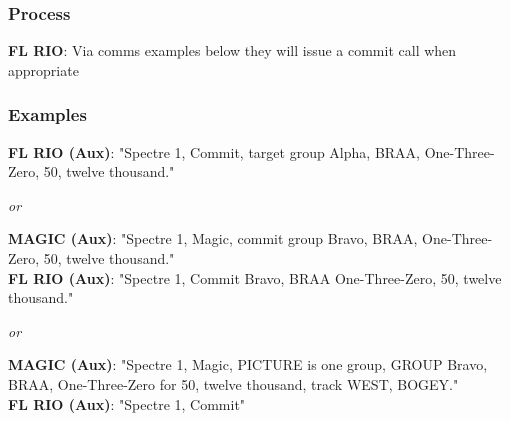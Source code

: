 \subsubsection*{Process}

\textbf{FL RIO}: Via comms examples below they will issue a commit call when
appropriate

\subsubsection*{Examples}

\textbf{FL RIO (Aux)}: "Spectre 1, Commit, target group Alpha, BRAA,
One-Three-Zero, 50, twelve thousand."

\textit{or}

\textbf{MAGIC (Aux)}: "Spectre 1, Magic, commit group Bravo, BRAA,
One-Three-Zero, 50, twelve thousand."\\
\textbf{FL RIO (Aux)}: "Spectre 1, Commit Bravo, BRAA One-Three-Zero, 50,
twelve thousand."

\textit{or}

\textbf{MAGIC (Aux)}: "Spectre 1, Magic, PICTURE is one group, GROUP Bravo,
BRAA, One-Three-Zero for 50, twelve thousand, track WEST, BOGEY."\\
\textbf{FL RIO (Aux)}: "Spectre 1, Commit"

